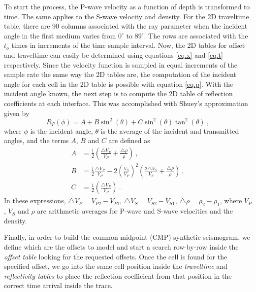 \documentclass{vie16}
\begin{document}
To start the process, the P-wave velocity as a function of depth
is transformed to time. The same applies to the S-wave velocity
and density. For the 2D traveltime table, there are 90 columns
associated with the ray parameter when the incident angle in the
first medium varies from $0^{\circ}$ to $89^{\circ}$. The rows are
associated with the $t_{o}$ times in increments of the time
sample interval. Now, the 2D tables for offset and traveltime
can easily be determined using equations \ref{eq.x} and
\ref{eq.t} respectively. Since the velocity function is sampled
in equal increments of the sample rate the same way the 2D
tables are, the computation of the incident angle for each cell
in the 2D table is possible with equation \ref{eq.p}. With the
incident angle known, the next step is to compute the 2D table
of reflection coefficients at each interface. This was
accomplished with Shuey's approximation \citep{Shuey1985} given by
\begin{equation}
R_{P} (\phi) = A + B\sin^{2}(\theta) + C\sin^{2}(\theta)\tan^{2}(\theta)
\ , \label{eq.shuey}
\end{equation}
where $\phi$ is the incident angle, $\theta$ is the average of
the incident and transmitted angles, and the terms $A$, $B$ and
$C$ are defined as
\begin{equation}
\begin{split}
A & = \frac{1}{2} \left(\frac{\triangle V_{P}}{V_{P}}     +
\frac{\triangle \rho}{\rho}     \right)\ , \\
B & = \frac{1}{2} \frac{\triangle V_{P}}{V_{P}}  - 2\left(\frac{
V_{S}}{V_{P}}\right)^{2}  \left(\frac{2\triangle V_{S}}{V_{S}} +
\frac{\triangle \rho}{\rho}\right)   \ , \\
C & = \frac{1}{2} \left(\frac{\triangle V_{P}}{V_{P}} \right) \ .
\end{split}
\end{equation}
In these expressions, $\triangle V_{P} = V_{P2} - V_{P1}$,
$\triangle V_{S} = V_{S2} - V_{S1}$, $\triangle \rho = \rho_{2}
- \rho_{1}$, where $V_{P}$, $V_{S}$ and $\rho$ are arithmetic
averages for P-wave and S-wave velocities and the density.

Finally, in order to build the common-midpoint (CMP) synthetic
seismogram, we define which are the offsets to model and start a
search row-by-row inside the \textit{offset table} looking for
the requested offsets.  Once the cell is found for the specified
offset, we go into the same cell position inside the
\textit{traveltime} and \textit{reflectivity tables} to place
the reflection coefficient from that position in the correct
time arrival inside the trace.
\end{document}
